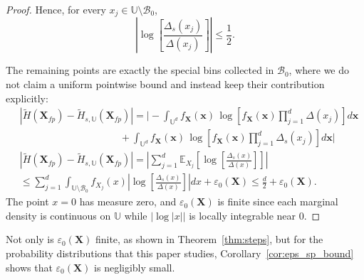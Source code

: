 \documentclass[12pt,onecolumn, margin=1in]{IEEEtran}
\newcommand{\bracket}[1]{\left[ #1 \right]}
\newcommand{\abs}[1]{\left| #1 \right|}
\newcommand{\Esub}[2]{\mathbb{E}_{#2}\left[ #1 \right]}
\begin{document}
\begin{proof}
Hence, for every $x_j\in \mathbb U\setminus \mathcal B_{0}$,
\begin{equation}
\abs{\log\bracket{\frac{\Delta_s(x_j)}{\Delta(x_j)}}} \leq \frac{1}{2}.
\end{equation}

The remaining points are exactly the special bins collected in $\mathcal B_{0}$, where we do not claim a uniform pointwise bound and instead keep their contribution explicitly:
\begin{equation}
\begin{aligned}
&\left|
\tilde H(\mathbf X_{fp}) - \tilde H_{s,\mathbb U}(\mathbf X_{fp}) \right| = \Bigg | -\int_{\mathbb U^d} f_{\mathbf X}(\mathbf x)\,\log\left[f_{\mathbf X}(\mathbf x)\prod_{j=1}^d \Delta(x_j)\right]d\mathbf x  \\ & \qquad \qquad \qquad \qquad \qquad
+ \int_{\mathbb U^d} f_{\mathbf X}(\mathbf x)\,\log\left[f_{\mathbf X}(\mathbf x)\prod_{j=1}^d \Delta_s(x_j)\right]d\mathbf x \Bigg |\\
&\left|
\tilde H(\mathbf X_{fp}) - \tilde H_{s,\mathbb U}(\mathbf X_{fp}) \right| = \abs{\sum_{j=1}^{d} \Esub{\log\bracket{\frac{\Delta_s(x)}{\Delta(x)}}}{X_j}} \\
&\leq\sum_{j=1}^{d} \int_{\mathbb U\setminus \mathcal B_{0}} f_{X_j}(x) \abs{\log\bracket{\frac{\Delta_s(x)}{\Delta(x)}}}dx + \varepsilon_{0}(\mathbf X) \leq\frac d2 + \varepsilon_{0}(\mathbf X).
\end{aligned}
\end{equation}
The point $x=0$ has measure zero, and $\varepsilon_{0}(\mathbf X)$ is finite since each marginal density is continuous on $\mathbb U$ while $|\log|x||$ is locally integrable near $0$.
\end{proof}

Not only is $\varepsilon_{0}(\mathbf X)$ finite, as shown in Theorem~\ref{thm:steps}, but for the probability distributions that this paper studies, Corollary~\ref{cor:eps_sp_bound} shows that $\varepsilon_{0}(\mathbf X)$ is negligibly small.
\end{document}
